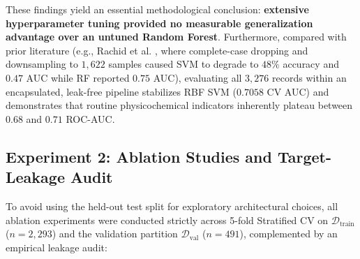 \documentclass[pdflatex,sn-mathphys-num]{sn-jnl}%
\theoremstyle{thmstyleone}%
\theoremstyle{thmstyletwo}%
\theoremstyle{thmstylethree}%
\begin{document}
These findings yield an essential methodological conclusion: \textbf{extensive hyperparameter tuning provided no measurable generalization advantage over an untuned Random Forest}. Furthermore, compared with prior literature (e.g., Rachid et al. \cite{rachid2025}, where complete-case dropping and downsampling to $1,622$ samples caused SVM to degrade to $48\%$ accuracy and $0.47$ AUC while RF reported $0.75$ AUC), evaluating all $3,276$ records within an encapsulated, leak-free pipeline stabilizes RBF SVM ($0.7058$ CV AUC) and demonstrates that routine physicochemical indicators inherently plateau between $0.68$ and $0.71$ ROC-AUC.

\subsection{Experiment 2: Ablation Studies and Target-Leakage Audit}\label{subsec5_4}

To avoid using the held-out test split for exploratory architectural choices, all ablation experiments were conducted strictly across 5-fold Stratified CV on $\mathcal{D}_{\text{train}}$ ($n = 2,293$) and the validation partition $\mathcal{D}_{\text{val}}$ ($n = 491$), complemented by an empirical leakage audit:
\end{document}
